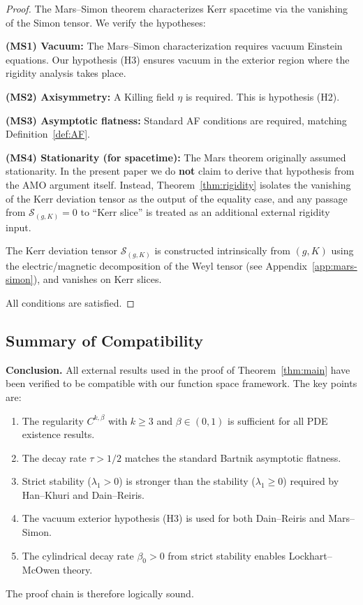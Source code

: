 \begin{proof}
The Mars--Simon theorem characterizes Kerr spacetime via the vanishing of the Simon tensor. We verify the hypotheses:

\textbf{(MS1) Vacuum:} The Mars--Simon characterization requires vacuum Einstein equations. Our hypothesis (H3) ensures vacuum in the exterior region where the rigidity analysis takes place.

\textbf{(MS2) Axisymmetry:} A Killing field $\eta$ is required. This is hypothesis (H2).

\textbf{(MS3) Asymptotic flatness:} Standard AF conditions are required, matching Definition~\ref{def:AF}.

\textbf{(MS4) Stationarity (for spacetime):} The Mars theorem originally assumed stationarity. In the present paper we do \textbf{not} claim to derive that hypothesis from the AMO argument itself. Instead, Theorem~\ref{thm:rigidity} isolates the vanishing of the Kerr deviation tensor as the output of the equality case, and any passage from $\mathcal{S}_{(g,K)}=0$ to ``Kerr slice'' is treated as an additional external rigidity input.

The Kerr deviation tensor $\mathcal{S}_{(g,K)}$ is constructed intrinsically from $(g, K)$ using the electric/magnetic decomposition of the Weyl tensor (see Appendix~\ref{app:mars-simon}), and vanishes on Kerr slices.

All conditions are satisfied. \qedhere
\end{proof}

\subsection{Summary of Compatibility}

\textbf{Conclusion.} All external results used in the proof of Theorem~\ref{thm:main} have been verified to be compatible with our function space framework. The key points are:
\begin{enumerate}[label=(\arabic*)]
    \item The regularity $C^{k,\beta}$ with $k \geq 3$ and $\beta \in (0,1)$ is sufficient for all PDE existence results.
    \item The decay rate $\tau > 1/2$ matches the standard Bartnik asymptotic flatness.
    \item Strict stability ($\lambda_1 > 0$) is stronger than the stability ($\lambda_1 \geq 0$) required by Han--Khuri and Dain--Reiris.
    \item The vacuum exterior hypothesis (H3) is used for both Dain--Reiris and Mars--Simon.
    \item The cylindrical decay rate $\beta_0 > 0$ from strict stability enables Lockhart--McOwen theory.
\end{enumerate}
The proof chain is therefore logically sound.

